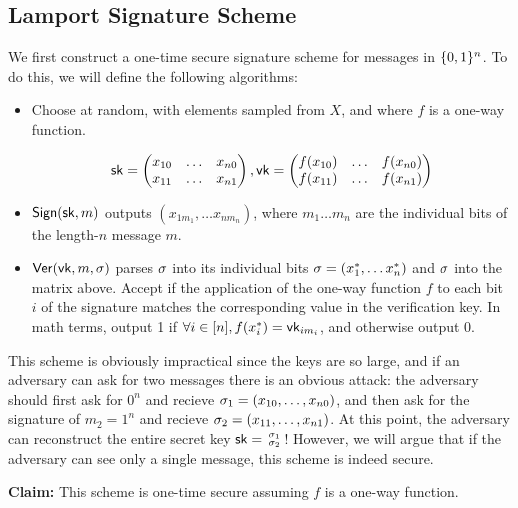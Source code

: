 \subsection{Lamport Signature Scheme}
We first construct a one-time secure signature scheme for messages in $\{0,1\}^n$. To do this, we will define the following algorithms:


\begin{itemize}
	\item Choose at random, with elements sampled from $X$, and where $f$ is a one-way function.

\[ {\mathsf{sk}} = \begin{pmatrix}
	x_{10} & \ldots & x_{n0} \\
	x_{11} & \ldots & x_{n1} \\
	\end{pmatrix}, \mathsf{vk} = \begin{pmatrix}
	f(x_{10}) & \ldots & f(x_{n0}) \\
	f(x_{11}) & \ldots & f(x_{n1}) \\
\end{pmatrix}\]
	\item $\mathsf{Sign}({\mathsf{sk}}, m)$ outputs $(x_{1m_1}, \ldots x_{nm_n})$, where $m_1 \ldots m_n$ are the individual bits of the length-$n$ message $m$.
	\item $\mathsf{Ver}(\mathsf{vk}, m, \sigma)$ parses $\sigma$ into its individual bits $\sigma = (x_1^*, \ldots x_n^*)$ and $\sigma$ into the matrix above. Accept if the application of the one-way function $f$ to each bit $i$ of the signature matches the corresponding value in the verification key. In math terms, output 1 if $\forall i \in [n], f(x^*_i) = \mathsf{vk}_{im_i}$, and otherwise output 0.
\end{itemize}

This scheme is obviously impractical since the keys are so large, and if an adversary can ask for two messages there is an obvious attack: the adversary should first ask for $0^n$ and recieve $\sigma_1 = (x_{10}, \ldots, x_{n0})$, and then ask for the signature of $m_2 = 1^n$ and recieve $\sigma_2 = (x_{11}, \ldots, x_{n1})$. At this point, the adversary can reconstruct the entire secret key ${\mathsf{sk}} = \begin{smallmatrix} \sigma_1 \\ \sigma_2 \end{smallmatrix}$! However, we will argue that if the adversary can see only a single message, this scheme is indeed secure.

\textbf{Claim:} This scheme is one-time secure assuming $f$ is a one-way function.

